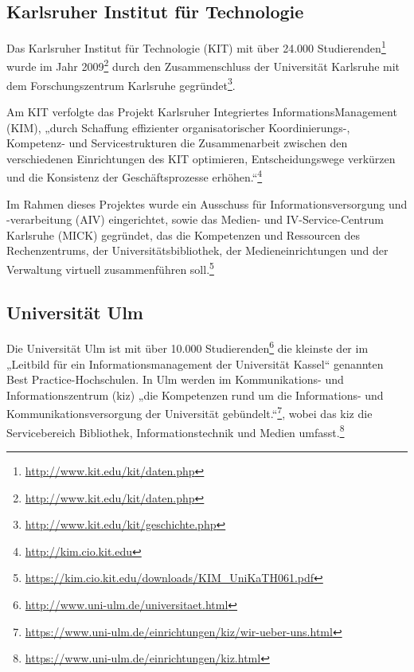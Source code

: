 \subsection{Karlsruher Institut für Technologie}
Das Karlsruher Institut für Technologie (KIT) mit über 24.000 Studierenden\footnote{\url{http://www.kit.edu/kit/daten.php}} wurde im Jahr 2009\footnote{\url{http://www.kit.edu/kit/daten.php}} durch den Zusammenschluss der Universität Karlsruhe mit dem Forschungszentrum Karlsruhe gegründet\footnote{\url{http://www.kit.edu/kit/geschichte.php}}.

Am KIT verfolgte das Projekt Karlsruher Integriertes InformationsManagement (KIM), „durch Schaffung effizienter organisatorischer Koordinierungs-, Kompetenz- und Servicestrukturen die Zusammenarbeit zwischen den verschiedenen Einrichtungen des KIT optimieren, Entscheidungswege verkürzen und die Konsistenz der Geschäftsprozesse erhöhen.“\footnote{\url{http://kim.cio.kit.edu}}

Im Rahmen dieses Projektes wurde ein Ausschuss für Informationsversorgung und -verarbeitung (AIV) eingerichtet, sowie das Medien- und IV-Service-Centrum Karlsruhe (MICK) gegründet, das die Kompetenzen und Ressourcen des Rechenzentrums, der Universitätsbibliothek, der Medieneinrichtungen und der Verwaltung virtuell zusammenführen soll.\footnote{\url{https://kim.cio.kit.edu/downloads/KIM_UniKaTH061.pdf}}

\subsection{Universität Ulm}
Die Universität Ulm ist mit über 10.000 Studierenden\footnote{\url{http://www.uni-ulm.de/universitaet.html}} die kleinste der im „Leitbild für ein Informationsmanagement der Universität Kassel“ genannten Best Practice-Hochschulen. In Ulm werden im Kommunikations- und Informationszentrum (kiz) „die Kompetenzen rund um die Informations- und Kommunikationsversorgung der Universität gebündelt.“\footnote{\url{https://www.uni-ulm.de/einrichtungen/kiz/wir-ueber-uns.html}}, wobei das kiz die Servicebereich Bibliothek, Informationstechnik und Medien umfasst.\footnote{\url{https://www.uni-ulm.de/einrichtungen/kiz.html}}
